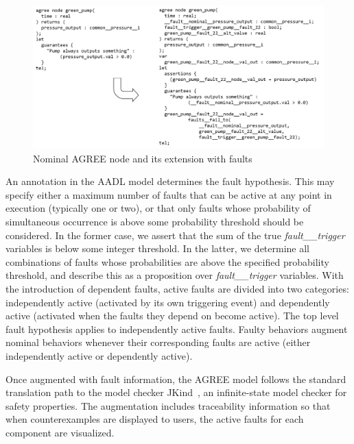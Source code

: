 \begin{figure}
	\vspace{-0.1in}
	\includegraphics[width=\textwidth]{images/sample_code.png}
	\vspace{-0.3in}
	\caption{Nominal AGREE node and its extension with faults}
	\label{fig:comp}
\end{figure}

An annotation in the AADL model determines the fault hypothesis.  This may specify either a maximum number of faults that can be active at any point in execution (typically one or two), or that only faults whose probability of simultaneous occurrence is above some probability threshold should be considered. In the former case, we assert that the sum of the true {\em fault\_\_trigger} variables is below some integer threshold.  In the latter, we determine all combinations of faults whose probabilities are above the specified probability threshold, and describe this as a proposition over {\em fault\_\_trigger} variables.
%
With the introduction of dependent faults, active faults are divided into two categories: independently active (activated by its own triggering event) and dependently active (activated when the faults they depend on become active). The top level fault hypothesis applies to independently active faults. Faulty behaviors augment nominal behaviors whenever their corresponding faults are active (either independently active or dependently active).

Once augmented with fault information, the AGREE model follows the standard translation path to the model checker JKind~\cite{2017arXiv171201222G}, an infinite-state model checker for safety properties.  The augmentation includes traceability information so that when counterexamples are displayed to users, the active faults for each component are visualized.



